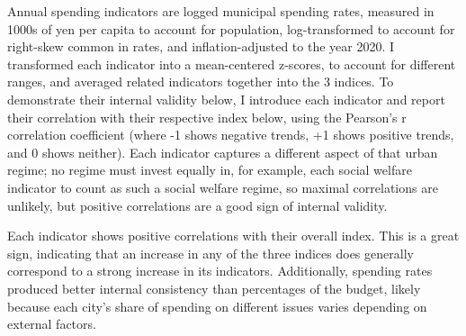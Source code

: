 \documentclass[preprint, 3p,
authoryear]{elsarticle} %
\begin{document}
Annual spending indicators are logged municipal spending rates, measured
in 1000s of yen per capita to account for population, log-transformed to
account for right-skew common in rates, and inflation-adjusted to the
year 2020. I transformed each indicator into a mean-centered z-scores,
to account for different ranges, and averaged related indicators
together into the 3 indices. To demonstrate their internal validity
below, I introduce each indicator and report their correlation with
their respective index below, using the Pearson's r correlation
coefficient (where -1 shows negative trends, +1 shows positive trends,
and 0 shows neither). Each indicator captures a different aspect of that
urban regime; no regime must invest equally in, for example, each social
welfare indicator to count as such a social welfare regime, so maximal
correlations are unlikely, but positive correlations are a good sign of
internal validity.

Each indicator shows positive correlations with their overall index.
This is a great sign, indicating that an increase in any of the three
indices does generally correspond to a strong increase in its
indicators. Additionally, spending rates produced better internal
consistency than percentages of the budget, likely because each city's
share of spending on different issues varies depending on external
factors.
\end{document}
